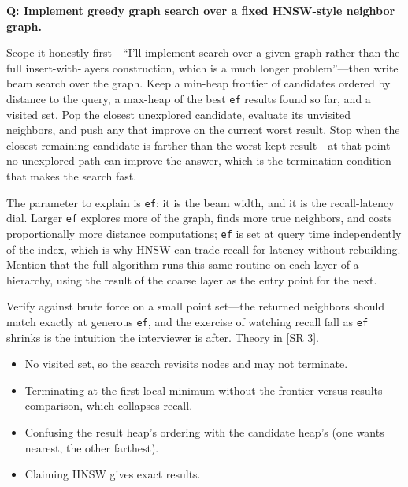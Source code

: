 \begin{interviewq}
\textbf{Q: Implement greedy graph search over a fixed HNSW-style neighbor graph.}

 \quad {} \quad \badgefreq{\freqmed}

\stronganswer

Scope it honestly first---``I'll implement search over a given graph rather than the full insert-with-layers construction, which is a much longer problem''---then write beam search over the graph. Keep a min-heap frontier of candidates ordered by distance to the query, a max-heap of the best \texttt{ef} results found so far, and a visited set. Pop the closest unexplored candidate, evaluate its unvisited neighbors, and push any that improve on the current worst result. Stop when the closest remaining candidate is farther than the worst kept result---at that point no unexplored path can improve the answer, which is the termination condition that makes the search fast.

The parameter to explain is \texttt{ef}: it is the beam width, and it is the recall-latency dial. Larger \texttt{ef} explores more of the graph, finds more true neighbors, and costs proportionally more distance computations; \texttt{ef} is set at query time independently of the index, which is why HNSW can trade recall for latency without rebuilding. Mention that the full algorithm runs this same routine on each layer of a hierarchy, using the result of the coarse layer as the entry point for the next.

Verify against brute force on a small point set---the returned neighbors should match exactly at generous \texttt{ef}, and the exercise of watching recall fall as \texttt{ef} shrinks is the intuition the interviewer is after. Theory in [SR 3].

\redflags
\begin{itemize}
    \item No visited set, so the search revisits nodes and may not terminate.
    \item Terminating at the first local minimum without the frontier-versus-results comparison, which collapses recall.
    \item Confusing the result heap's ordering with the candidate heap's (one wants nearest, the other farthest).
    \item Claiming HNSW gives exact results.
\end{itemize}



\end{interviewq}
